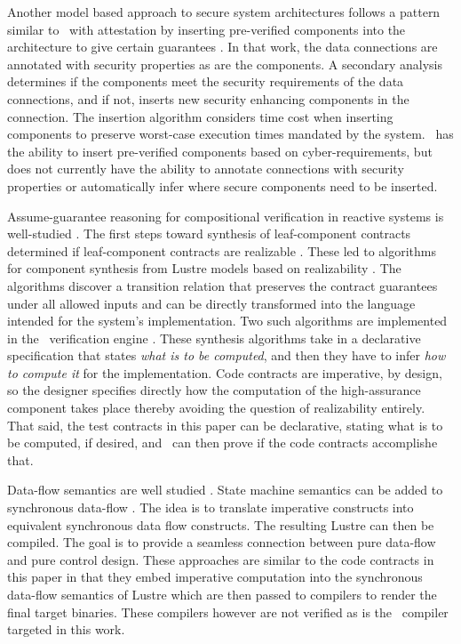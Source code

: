 
Another model based approach to secure system architectures follows a pattern similar to \brfcs\ with attestation by inserting pre-verified components into the architecture to give certain guarantees \cite{6209212}.
In that work, the data connections are annotated with security properties as are the components.
A secondary analysis determines if the components meet the security requirements of the data connections, and if not, inserts new security enhancing components in the connection.
The insertion algorithm considers time cost when inserting components to preserve worst-case execution times mandated by the system.
\brfcs\ has the ability to insert pre-verified components based on cyber-requirements, but does not currently have the ability to annotate connections with security properties or automatically infer where secure components need to be inserted. 

Assume-guarantee reasoning for compositional verification in reactive systems is well-studied \cite{10.1007/978-3-642-28891-3_13, 10.1145/2658982.2527272, 10.1007/978-3-319-17524-9_7}.
The first steps toward synthesis of leaf-component contracts determined if leaf-component contracts are realizable \cite{10.1007/978-3-319-17524-9_13, 10.1007/978-3-319-29613-5_7}.
These led to algorithms for component synthesis from Lustre models based on realizability \cite{katis2017synthesis, 10.1007/978-3-319-89963-3_10}.
The algorithms discover a transition relation that preserves the contract guarantees under all allowed inputs and can be directly transformed into the language intended for the system's implementation.
Two such algorithms are implemented in the \agr\ verification engine \cite{jkind}.
These synthesis algorithms take in a declarative specification that states \emph{what is to be computed}, and then they have to infer \emph{how to compute it} for the implementation.
Code contracts are imperative, by design, so the designer specifies directly how the computation of the high-assurance component takes place thereby avoiding the question of realizability entirely.
That said, the test contracts in this paper can be declarative, stating what is to be computed, if desired, and \agr\ can then prove if the code contracts accomplishe that.

Data-flow semantics are well studied \cite{10.1145/41625.41641,97300,
10.1145/1379023.1375674,10.1145/2345141.2248426,10.1007/978-3-540-45212-6_10}.
State machine semantics can be added to synchronous
data-flow \cite{10.1145/1086228.1086261}. The idea is to translate
imperative constructs into equivalent synchronous data flow
constructs. The resulting Lustre can then be compiled. The goal is to
provide a seamless connection between pure data-flow and pure control
design.
These approaches are similar to the code contracts in this paper in that they embed imperative computation into the synchronous data-flow semantics of Lustre which are then passed to compilers to render the final target binaries.
These compilers however are not verified as is the \ckml\ compiler targeted in this work.

